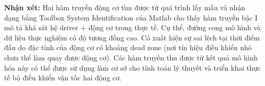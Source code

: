                \textbf{Nhận xét:} Hai hàm truyền động cơ tìm được từ quá trình lấy mẫu
               và nhận dạng bằng Toolbox System Identification của Matlab cho thấy hàm truyền bậc I mô 
               tả khá sát hệ driver + động cơ trong thực tế. Cụ thể, đường cong mô hình và dữ liệu thực nghiệm có độ tương 
               đồng cao. Có xuất hiện sự sai lệch tại thời điểm đầu do đặc tính của động cơ có khoảng dead zone (nơi tín hiệu điều khiển nhỏ chưa thể làm quay được động cơ). Các hàm truyền thu được từ kết quả mô hình hóa này có thể được
               sử dụng làm cơ sở cho tính toán lý thuyết và triển khai thực tế bộ điều khiển vận tốc hai động cơ.
     




          


